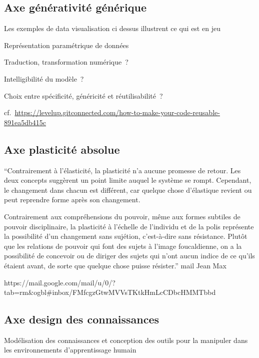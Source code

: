 \documentclass[
  letterpaper,
  DIV=11,
  numbers=noendperiod]{scrreprt}
\begin{document}
\hypertarget{sec-axeGeneratif}{%
\subsection{Axe générativité générique}\label{sec-axeGeneratif}}

Les exemples de data visualisation ci dessus illustrent ce qui est en
jeu

Représentation paramétrique de données

Traduction, transformation numérique~?

Intelligibilité du modèle~?

Choix entre spécificité, généricité et réutilisabilité~?

cf.~\url{https://levelup.gitconnected.com/how-to-make-your-code-reusable-891ea5db415c}

\hypertarget{sec-axePlasticite}{%
\subsection{Axe plasticité absolue}\label{sec-axePlasticite}}

``Contrairement à l'élasticité, la plasticité n'a aucune promesse de
retour. Les deux concepts suggèrent un point limite auquel le système se
rompt. Cependant, le changement dans chacun est différent, car quelque
chose d'élastique revient ou peut reprendre forme après son changement.

Contrairement aux compréhensions du pouvoir, même aux formes subtiles de
pouvoir disciplinaire, la plasticité à l'échelle de l'individu et de la
polis représente la possibilité d'un changement sans sujétion,
c'est-à-dire sans résistance. Plutôt que les relations de pouvoir qui
font des sujets à l'image foucaldienne, on a la possibilité de concevoir
ou de diriger des sujets qui n'ont aucun indice de ce qu'ils étaient
avant, de sorte que quelque chose puisse résister.'' mail Jean Max

https://mail.google.com/mail/u/0/?tab=rm\&ogbl\#inbox/FMfcgzGtwMVVsTKtkHmLcCDbcHMMTbbd

\hypertarget{sec-axeDesignConnaissances}{%
\subsection{Axe design des
connaissances}\label{sec-axeDesignConnaissances}}

Modélisation des connaissances et conception des outils pour la
manipuler dans les environnements d'apprentissage humain
\end{document}
